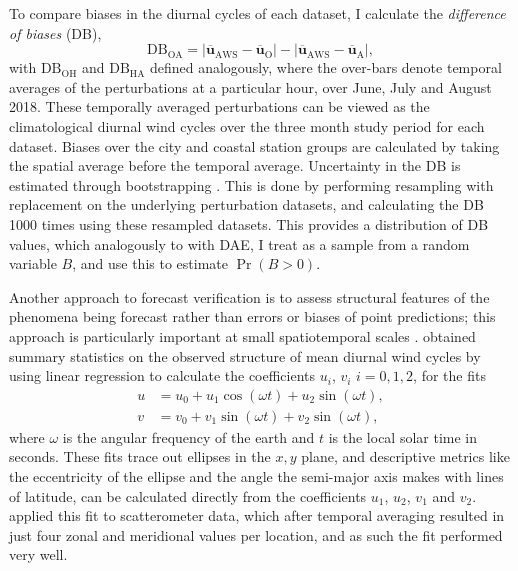\documentclass[twocol]{ametsoc}
\DeclareMathOperator{\pr}{Pr}
\begin{document}
To compare biases in the diurnal cycles of each dataset, I calculate the \textit{difference of biases} (DB),
\begin{equation}
\text{DB}_{\text{OA}} = \left\lvert \overline{\mathbf{u}}_{\text{AWS}}-\overline{\mathbf{u}}_{\text{O}} \right\rvert - \left\lvert \overline{\mathbf{u}}_{\text{AWS}}-\overline{\mathbf{u}}_{\text{A}} \right\rvert,
\end{equation}
with $\text{DB}_{\text{OH}}$ and $\text{DB}_{\text{HA}}$ defined analogously, where the over-bars denote temporal averages of the perturbations at a particular hour, over June, July and August 2018. These temporally averaged perturbations can be viewed as the climatological diurnal wind cycles over the three month study period for each dataset. Biases over the city and coastal station groups are calculated by taking the spatial average before the temporal average. Uncertainty in the DB is estimated through bootstrapping \citep{efron79}. This is done by performing resampling with replacement on the underlying perturbation datasets, and calculating the DB 1000 times using these resampled datasets. This provides a distribution of DB values, which analogously to with DAE, I treat as a sample from a random variable $B$, and use this to estimate $\pr\left(B > 0\right)$.

Another approach to forecast verification is to assess structural features of the phenomena being forecast rather than errors or biases of point predictions; this approach is particularly important at small spatiotemporal scales \citep[e.g.][]{mass02, rife05}. \citet{gille05} obtained summary statistics on the observed structure of mean diurnal wind cycles by using linear regression to calculate the coefficients $u_i$, $v_i$ $i=0,1,2$, for the fits 
\begin{align}
u &= u_0 + u_1 \cos(\omega t) + u_2 \sin(\omega t), \label{Eq:u_h} \\
v &= v_0 + v_1 \sin(\omega t) + v_2 \sin(\omega t), \label{Eq:v_h}
\end{align}
where $\omega$ is the angular frequency of the earth and $t$ is the local solar time in seconds. These fits trace out ellipses in the $x,y$ plane, and descriptive metrics like the eccentricity of the ellipse and the angle the semi-major axis makes with lines of latitude, can be calculated directly from the coefficients $u_1$, $u_2$, $v_1$ and $v_2$. \citet{gille05} applied this fit to scatterometer data, which after temporal averaging resulted in just four zonal and meridional values per location, and as such the fit performed very well.  
\end{document}
